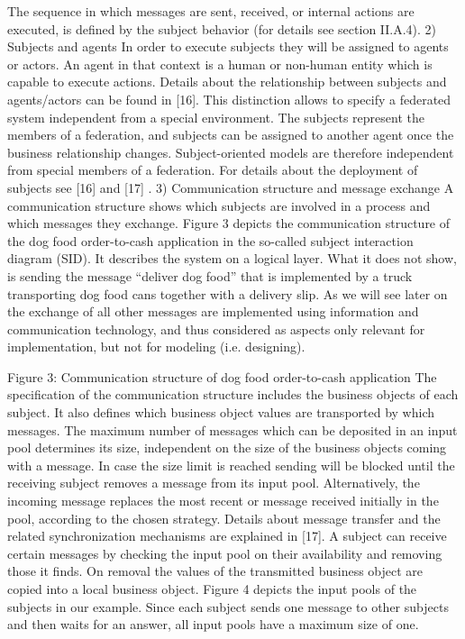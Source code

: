 The sequence in which messages are sent, received, or internal actions are executed, is defined by the subject behavior (for details see section II.A.4).
2)	Subjects and agents
In order to execute subjects they will be assigned to agents or actors. An agent in that context is a human or non-human entity which is capable to execute actions. Details about the relationship between subjects and agents/actors can be found in [16]. This distinction allows to specify a federated system independent from a special environment. The subjects represent the members of a federation, and subjects can be assigned to another agent once the business relationship changes. Subject-oriented models are therefore independent from special members of a federation. For details about the deployment of subjects see [16] and [17] .
3)	Communication structure and message exchange
A communication structure shows which subjects are involved in a process and which messages they exchange. Figure 3 depicts the communication structure of the dog food order-to-cash application in the so-called subject interaction diagram (SID). It describes the system on a logical layer. What it does not show, is sending the message “deliver dog food” that is implemented by a truck transporting dog food cans together with a delivery slip. As we will see later on the exchange of all other messages are implemented using information and communication technology, and thus considered as aspects only relevant for implementation, but not for modeling (i.e. designing).

Figure 3: Communication structure of dog food order-to-cash application
The specification of the communication structure includes the business objects of each subject. It also defines which business object values are transported by which messages. The maximum number of messages which can be deposited in an input pool determines its size, independent on the size of the business objects coming with a message. In case the size limit is reached sending will be blocked until the receiving subject removes a message from its input pool. Alternatively, the incoming message replaces the most recent or message received initially in the pool, according to the chosen strategy. Details about message transfer and the related synchronization mechanisms are explained in [17].
A subject can receive certain messages by checking the input pool on their availability and removing those it finds. On removal the values of the transmitted business object are copied into a local business object. 
Figure 4 depicts the input pools of the subjects in our example. Since each subject sends one message to other subjects and then waits for an answer, all input pools have a maximum size of one.

